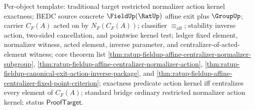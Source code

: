 Per-object template: traditional target restricted normalizer action kernel
exactness; BEDC source concrete $\FieldUp(\RatUp)$ affine exit plus
$\GroupUp$; carrier $C_F(A)$ acted on by $N_F(C_F(A))$; classifier
$\equiv_{\mathrm{aff}}$; stability inverse action, two-sided cancellation,
and pointwise kernel test; ledger fixed element, normalizer witness, acted
element, inverse parameter, and centralizer-of-acted-element witness; core
theorem list
\autoref{thm:ratup-fieldup-affine-centralizer-normalizer-subgroup},
\autoref{thm:ratup-fieldup-affine-centralizer-normalizer-action},
\autoref{thm:ratup-fieldup-canonical-exit-action-inverse-package}, and
\autoref{thm:ratup-fieldup-affine-centralizer-fixed-point-criterion};
exactness predicate action kernel iff centralizes every element of $C_F(A)$;
standard bridge ordinary restricted normalizer action kernel; status
$\mathsf{ProofTarget}$.

